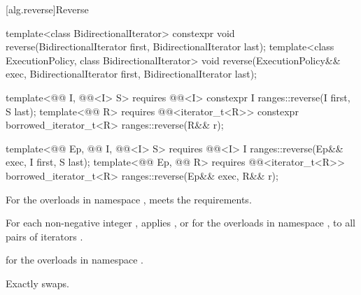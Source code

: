 [alg.reverse]{Reverse}

%
\begin{itemdecl}
template<class BidirectionalIterator>
  constexpr void reverse(BidirectionalIterator first, BidirectionalIterator last);
template<class ExecutionPolicy, class BidirectionalIterator>
  void reverse(ExecutionPolicy&& exec,
               BidirectionalIterator first, BidirectionalIterator last);

template<@@ I, @@<I> S>
  requires @@<I>
  constexpr I ranges::reverse(I first, S last);
template<@@ R>
  requires @@<iterator_t<R>>
  constexpr borrowed_iterator_t<R> ranges::reverse(R&& r);

template<@@ Ep, @@ I, @@<I> S>
  requires @@<I>
  I ranges::reverse(Ep&& exec, I first, S last);
template<@@ Ep, @@ R>
  requires @@<iterator_t<R>>
  borrowed_iterator_t<R> ranges::reverse(Ep&& exec, R&& r);
\end{itemdecl}

\begin{itemdescr}
\pnum
\expects
For the overloads in namespace ,
 meets
the  requirements.

\pnum
\effects
For each non-negative integer ,
applies , or
 for the overloads in namespace ,
to all pairs of iterators .

\pnum
\returns
{} for the overloads in namespace .

\pnum
\complexity
Exactly  swaps.
\end{itemdescr}


